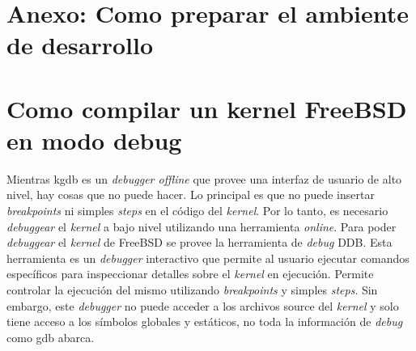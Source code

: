 \documentclass[a4paper]{book}
\begin{document}
\appendix
\section{Anexo: Como preparar el ambiente de desarrollo}

\section{Como compilar un kernel FreeBSD en modo debug}
Mientras kgdb es un \emph{debugger offline} que provee una interfaz de usuario de alto nivel, hay cosas que no puede hacer. Lo principal es que no puede insertar \emph{breakpoints} ni simples \emph{steps} en el código del \emph{kernel}. Por lo tanto, es necesario \emph{debuggear} el \emph{kernel} a bajo nivel utilizando una herramienta \emph{online}.
Para poder \emph{debuggear} el \emph{kernel} de FreeBSD se provee la herramienta de \emph{debug} DDB. Esta herramienta es un \emph{debugger} interactivo que permite al usuario ejecutar comandos específicos para inspeccionar detalles sobre el \emph{kernel} en ejecución. Permite controlar la ejecución del mismo utilizando \emph{breakpoints} y simples \emph{steps}. Sin embargo, este \emph{debugger} no puede acceder a los archivos source del \emph{kernel} y solo tiene acceso a los símbolos globales y estáticos, no toda la información de \emph{debug} como gdb abarca. \\
\end{document}
